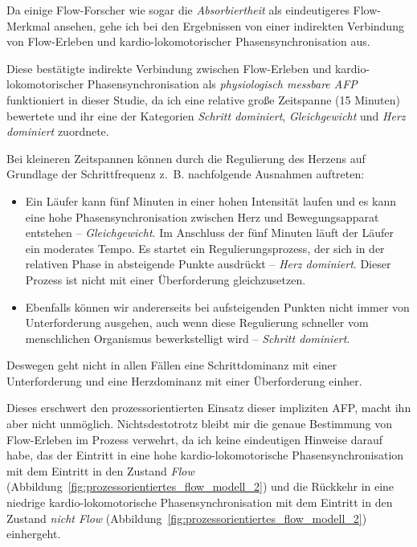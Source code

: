 Da einige Flow-Forscher wie \citet{Peifer2014} sogar die \emph{Absorbiertheit} als eindeutigeres Flow-Merkmal ansehen, gehe ich bei den Ergebnissen von einer indirekten Verbindung von Flow-Erleben und kardio-lokomotorischer Phasensynchronisation aus. 

Diese bestätigte indirekte Verbindung zwischen Flow-Erleben und kardio-lokomotorischer Phasensynchronisation als \emph{physiologisch messbare \ac{AFP}} funktioniert in dieser Studie, da ich eine relative große Zeitspanne (15 Minuten) bewertete und ihr eine der Kategorien \emph{Schritt dominiert}, \emph{Gleichgewicht} und \emph{Herz dominiert} zuordnete.

Bei kleineren Zeitspannen können durch die Regulierung des Herzens auf Grundlage der Schrittfrequenz z.~B. nachfolgende Ausnahmen auftreten: 
\begin{itemize}
	
	\item Ein Läufer kann fünf Minuten in einer hohen Intensität laufen und es kann eine hohe Phasensynchronisation zwischen Herz  und Bewegungsapparat entstehen -- \emph{Gleichgewicht}. Im Anschluss der fünf Minuten läuft der Läufer ein moderates Tempo. Es startet ein Regulierungsprozess, der sich in der relativen Phase in absteigende Punkte ausdrückt -- \emph{Herz dominiert}. Dieser Prozess ist nicht mit einer Überforderung gleichzusetzen.
	
	\item Ebenfalls können wir andererseits bei aufsteigenden Punkten nicht immer von Unterforderung ausgehen, auch wenn diese Regulierung schneller vom menschlichen Organismus bewerkstelligt wird -- \emph{Schritt dominiert}.
\end{itemize}

Deswegen geht nicht in allen Fällen eine Schrittdominanz mit einer Unterforderung und eine Herzdominanz mit einer Überforderung einher. 

Dieses erschwert den prozessorientierten Einsatz dieser impliziten \ac{AFP}, macht ihn aber nicht unmöglich. Nichtsdestotrotz bleibt mir die genaue Bestimmung von Flow-Erleben im Prozess verwehrt, da ich keine eindeutigen Hinweise darauf habe, das der Eintritt in eine hohe kardio-lokomotorische Phasensynchronisation mit dem Eintritt in den Zustand \emph{Flow} (Abbildung~\ref{fig:prozessorientiertes_flow_modell_2}) und die Rückkehr in eine niedrige kardio-lokomotorische Phasensynchronisation mit dem Eintritt in den Zustand \emph{nicht Flow} (Abbildung~\ref{fig:prozessorientiertes_flow_modell_2}) einhergeht. 

